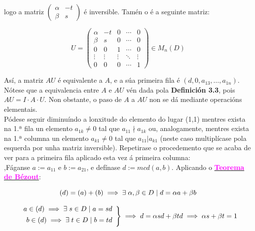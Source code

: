 \documentclass[twoside]{report}
\newcommand{\magbf}[1]{\textcolor{magenta}{\textbf{#1}}} %
\theoremstyle{mystyle}
\begin{document}
\begin{enumerate}
    logo a matriz 
    $
    \begin{pmatrix}
    \alpha & -t\\
    \beta & s
    \end{pmatrix}
    $
    é inversible. Tamén o é a seguinte matriz:
    
    $$
    U = \begin{pmatrix}
    \alpha & -t & 0 & \cdots & 0\\
    \beta & s & 0 & \cdots & 0\\
    0 & 0 & 1 & \cdots & 0\\
    \vdots & \vdots & \vdots & \ddots & \vdots\\
    0 & 0 & 0 & \cdots & 1
    \end{pmatrix}
    \in M_{n}(D)
    $$
    
    \vspace{3mm}
    
    Así, a matriz $AU$ é equivalente a $A$, e a súa primeira fila é $(d, 0, a_{13}, \dots, a_{1n})$. Nótese que a equivalencia entre $A$ e $AU$ vén dada pola \textbf{Definición 3.3}, pois $AU = I \cdot A \cdot U$. Non obstante, o paso de $A$ a $AU$ non se dá mediante operacións elementais.\\
    
    Pódese seguir diminuíndo a lonxitude do elemento do lugar (1,1) mentres exista na 1.ª fila un elemento $a_{1k} \neq 0$ tal que $a_{11} \nmid a_{1k}$ ou, analogamente, mentres exista na 1.ª columna un elemento $a_{k1} \neq 0$ tal que $a_{11} | a_{k1}$ (neste caso multiplícase pola esquerda por unha matriz inversible). Repetirase o procedemento que se acaba de ver para a primeira fila aplicado esta vez á primeira columna:\\
    
    ,Fáganse $a := a_{11}$ e $b := a_{21}$, e defínase $d := mcd(a,b)$. Aplicando o \hyperref[lem2.2]{\magbf{Teorema de Bézout}}:
    
    $$(d) = (a) + (b) \implies \exists \hspace{1mm} \alpha, \beta \in D \hspace{1mm} | \hspace{1mm} d = \alpha a + \beta b$$
    
    \[ 
    \left. \begin{array}{r} 
    a \in (d) \implies \exists \hspace{1mm} s \in D \hspace{1mm} | \hspace{1mm} a = sd \\[1ex]
    b \in (d) \implies \exists \hspace{1mm} t \in D \hspace{1mm} | \hspace{1mm} b = td \\[1ex]
    \end{array} \right\} 
    \implies d = \alpha sd + \beta td \implies \alpha s + \beta t = 1
    \]
    

\end{enumerate}
\end{document}
